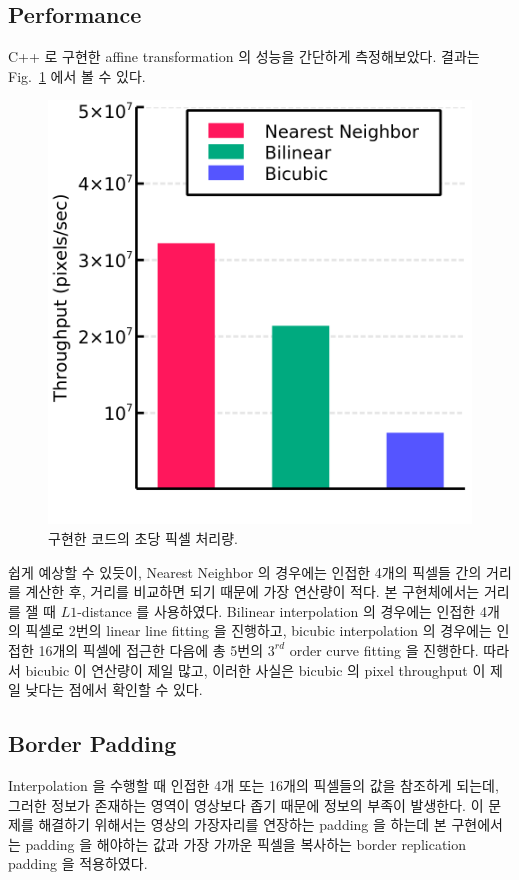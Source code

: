 \documentclass[a4paper, 12p]{paper}
\begin{document}
\subsection{Performance}
C++ 로 구현한 affine transformation 의 성능을 간단하게 측정해보았다. 결과는 Fig.~\ref{fig:throughput} 에서 볼 수 있다.

\begin{figure}[H]
\centering
\includegraphics[scale=0.45]{../data/throughput.png}
\caption{구현한 코드의 초당 픽셀 처리량.}
\label{fig:throughput}
\end{figure}

쉽게 예상할 수 있듯이, Nearest Neighbor 의 경우에는 인접한 4개의 픽셀들 간의 거리를 계산한 후, 거리를 비교하면 되기 때문에 가장 연산량이 적다. 본 구현체에서는 거리를 잴 때 $L1$-distance 를 사용하였다. Bilinear interpolation 의 경우에는 인접한 4개의 픽셀로 2번의 linear line fitting 을 진행하고, bicubic interpolation 의 경우에는 인접한 16개의 픽셀에 접근한 다음에 총 5번의 $3^{rd}$ order curve fitting 을 진행한다. 따라서 bicubic 이 연산량이 제일 많고, 이러한 사실은 bicubic 의 pixel throughput 이 제일 낮다는 점에서 확인할 수 있다.

\subsection{Border Padding}
Interpolation 을 수행할 때 인접한 4개 또는 16개의 픽셀들의 값을 참조하게 되는데, 그러한 정보가 존재하는 영역이 영상보다 좁기 때문에 정보의 부족이 발생한다. 이 문제를 해결하기 위해서는 영상의 가장자리를 연장하는 padding 을 하는데 본 구현에서는 padding 을 해야하는 값과 가장 가까운 픽셀을 복사하는 border replication padding 을 적용하였다.
\end{document}
